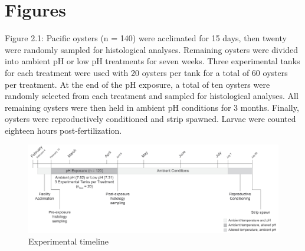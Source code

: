 \documentclass [11pt, proquest] {uwthesis}[2015/03/03]
\begin{document}
\hypertarget{figures-1}{%
\section{Figures}\label{figures-1}}
\begin{landscape}

Figure 2.1: Pacific oysters (n = 140) were acclimated for 15 days, then twenty were randomly sampled for histological analyses. Remaining oysters were divided into ambient pH or low pH treatments for seven weeks. Three experimental tanks for each treatment were used with 20 oysters per tank for a total of 60 oysters per treatment. At the end of the pH exposure, a total of ten oysters were randomly selected from each treatment and sampled for histological analyses. All remaining oysters were then held in ambient pH conditions for 3 months. Finally, oysters were reproductively conditioned and strip spawned. Larvae were counted eighteen hours post-fertilization.\newline 
\begin{figure}[h]
\centering
  \includegraphics[width=1.3\textwidth]{figure/Ch2/Figure2.1.jpg}
  \caption{Experimental timeline}
  \label{fig:expdesign}
\end{figure}
\end{landscape}
\clearpage
\end{document}
